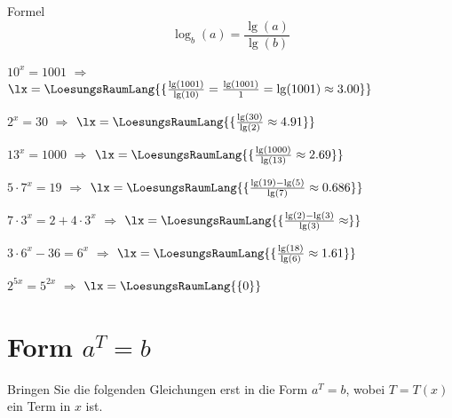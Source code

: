 Formel
$$\log_b(a) = \frac{\lg(a)}{\lg(b)}$$

\begin{bbwAufgabenBlock}

\item $10^x=1001$ $\Longrightarrow$
$\lx=\LoesungsRaumLang{\{\frac{\lg(1001)}{\lg(10)} = \frac{\lg(1001)}{1} = \lg(1001) \approx 3.00\}}$ \noTRAINER{\seitenUmbruchImAufgabenteil{}}

\item $2^x=30$ $\Longrightarrow$ $\lx=\LoesungsRaumLang{\{\frac{\lg(30)}{\lg(2)}\approx 4.91\}}$ \noTRAINER{\seitenUmbruchImAufgabenteil{}}
\item $13^x=1000$ $\Longrightarrow$ $\lx=\LoesungsRaumLang{\{\frac{\lg(1000)}{\lg(13)}\approx 2.69\}}$ 
\item $5\cdot{}7^x = 19$ $\Longrightarrow$ $\lx=\LoesungsRaumLang{\{\frac{\lg(19)-\lg(5)}{\lg(7)}\approx 0.686\}}$ \noTRAINER{\seitenUmbruchImAufgabenteil{}}
\item $7\cdot{}3^x = 2 + 4\cdot{}3^x$ $\Longrightarrow$ $\lx=\LoesungsRaumLang{\{\frac{\lg(2)-\lg(3)}{\lg(3)}\approx  \}}$ 
\item $3\cdot{}6^x - 36 = 6^x$ $\Longrightarrow$ $\lx=\LoesungsRaumLang{\{\frac{\lg(18)}{\lg(6)} \approx  1.61 \}}$ \noTRAINER{\seitenUmbruchImAufgabenteil{}}
\item $2^{5x} = 5^{2x}$ $\Longrightarrow$ $\lx=\LoesungsRaumLang{\{0\}}$ 
\end{bbwAufgabenBlock}

\newpage

\section{Form $a^{T} = b$}
Bringen Sie die folgenden Gleichungen erst in die Form $a^T=b$, wobei
$T=T(x)$ ein Term in $x$ ist.

